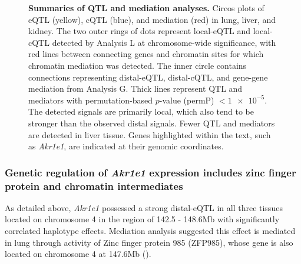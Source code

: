 \documentclass[10pt,letterpaper]{article}
\begin{document}
\begin{figure}[h!]
\caption{\textbf{Summaries of QTL and mediation analyses.} Circos plots of eQTL (yellow), cQTL (blue), and mediation (red) in lung, liver, and kidney. The two outer rings of dots represent local-eQTL and local-cQTL detected by Analysis L at chromosome-wide significance, with red lines between connecting genes and chromatin sites for which chromatin mediation was detected. The inner circle contains connections representing distal-eQTL, distal-cQTL, and gene-gene mediation from Analysis G. Thick lines represent QTL and mediators with permutation-based $p$-value (permP) $< \num{1e-5}$. The detected signals are primarily local, which also tend to be stronger than the observed distal signals. Fewer QTL and mediators are detected in liver tissue. 
Genes highlighted within the text, such as \textit{Akr1e1}, are indicated at their genomic coordinates.
\label{fig:circos_plot}}
\end{figure}

\subsubsection*{Genetic regulation of \textit{Akr1e1} expression includes zinc finger protein and chromatin intermediates}
As detailed above, \textit{Akr1e1} possessed a strong distal-eQTL in all three tissues located on chromosome 4 in the region of 142.5 - 148.6Mb with significantly correlated haplotype effects. Mediation analysis suggested this effect is mediated in lung through activity of Zinc finger protein 985 (ZFP985), whose gene is also located on chromosome 4 at 147.6Mb (). 
\end{document}
